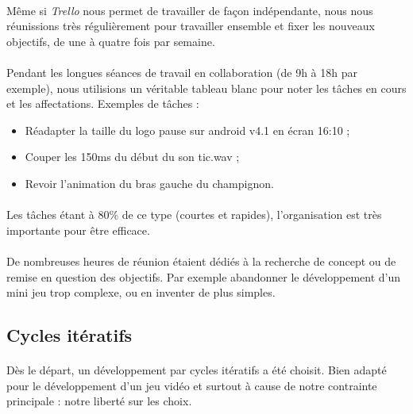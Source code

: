 \paragraph{}
Même si \textit{Trello} nous permet de travailler de façon indépendante, nous nous réunissions très régulièrement pour travailler ensemble et fixer les nouveaux objectifs, de une à quatre fois par semaine.

\paragraph{}
Pendant les longues séances de travail en collaboration (de 9h à 18h par exemple), nous utilisions un véritable tableau blanc pour noter les tâches en cours et les affectations. Exemples de tâches :

\begin{itemize}
\item Réadapter la taille du logo pause sur android v4.1 en écran 16:10 ;
\item Couper les 150ms du début du son tic.wav ;
\item Revoir l’animation du bras gauche du champignon.
\end{itemize}

\paragraph{}
Les tâches étant à 80\% de ce type (courtes et rapides), l’organisation est très importante pour être efficace.

\paragraph{}
De nombreuses heures de réunion étaient dédiés à la recherche de concept ou de remise en question des objectifs. Par exemple abandonner le développement d’un mini jeu trop complexe, ou en inventer de plus simples.

\subsection{Cycles itératifs}

\paragraph{}
Dès le départ, un développement par cycles itératifs a été choisit. Bien adapté pour le développement d’un jeu vidéo et surtout à cause de notre contrainte principale : notre liberté sur les choix.

